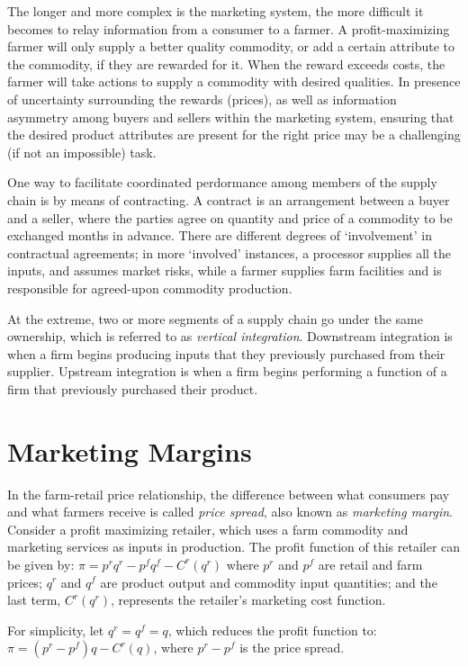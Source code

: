 \documentclass[]{book}
\begin{document}
The longer and more complex is the marketing system, the more difficult
it becomes to relay information from a consumer to a farmer. A
profit-maximizing farmer will only supply a better quality commodity, or
add a certain attribute to the commodity, if they are rewarded for it.
When the reward exceeds costs, the farmer will take actions to supply a
commodity with desired qualities. In presence of uncertainty surrounding
the rewards (prices), as well as information asymmetry among buyers and
sellers within the marketing system, ensuring that the desired product
attributes are present for the right price may be a challenging (if not
an impossible) task.

One way to facilitate coordinated perdormance among members of the
supply chain is by means of contracting. A contract is an arrangement
between a buyer and a seller, where the parties agree on quantity and
price of a commodity to be exchanged months in advance. There are
different degrees of `involvement' in contractual agreements; in more
`involved' instances, a processor supplies all the inputs, and assumes
market risks, while a farmer supplies farm facilities and is responsible
for agreed-upon commodity production.

At the extreme, two or more segments of a supply chain go under the same
ownership, which is referred to as \emph{vertical integration}.
Downstream integration is when a firm begins producing inputs that they
previously purchased from their supplier. Upstream integration is when a
firm begins performing a function of a firm that previously purchased
their product.

\section{Marketing Margins}\label{marketing-margins}

In the farm-retail price relationship, the difference between what
consumers pay and what farmers receive is called \emph{price spread},
also known as \emph{marketing margin}. Consider a profit maximizing
retailer, which uses a farm commodity and marketing services as inputs
in production. The profit function of this retailer can be given by:
\(\pi = p^r q^r - p^f q^f - C^r(q^r)\) where \(p^r\) and \(p^f\) are
retail and farm prices; \(q^r\) and \(q^f\) are product output and
commodity input quantities; and the last term, \(C^r(q^r)\), represents
the retailer's marketing cost function.

For simplicity, let \(q^r=q^f=q\), which reduces the profit function to:
\(\pi = (p^r - p^f) q - C^r(q)\), where \(p^r - p^f\) is the price
spread.
\end{document}
